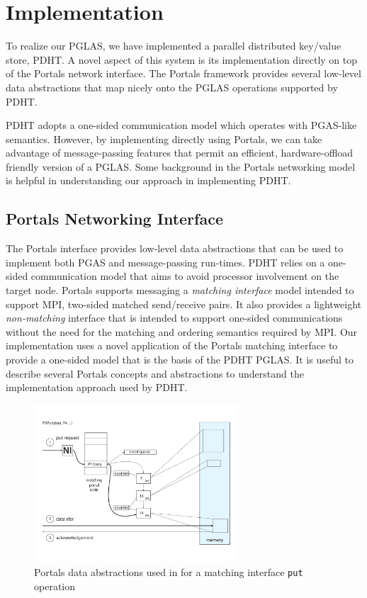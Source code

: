 \section{Implementation}

To realize our PGLAS, we have implemented a parallel distributed key/value store, 
PDHT. A novel aspect of this system is its implementation directly on top of the
Portals network interface. The Portals framework provides several low-level 
data abstractions that map nicely onto the PGLAS operations supported by PDHT.

PDHT adopts a one-sided communication model which operates 
with PGAS-like semantics. However, by implementing directly using Portals, we
can take advantage of message-passing features that permit an efficient, 
hardware-offload friendly version of a PGLAS. Some background in the Portals
networking model is helpful in understanding our approach in implementing PDHT.

\subsection{Portals Networking Interface}


The Portals interface provides low-level data abstractions that can be used to
implement both PGAS and message-passing run-times. PDHT relies on a one-sided
communication model that aims to avoid processor involvement on the target
node. Portals supports messaging a {\em matching interface} model intended to
support MPI, two-sided matched send/receive pairs. It also provides a
lightweight {\em non-matching} interface that is intended to support one-sided
communications without the need for the matching and ordering semantics
required by MPI. Our implementation uses a novel application of the Portals
matching interface to provide a one-sided model that is the basis of the PDHT
PGLAS. It is useful to describe several Portals concepts and abstractions to
understand the implementation approach used by PDHT.

\begin{figure}[ht]
  \centering
  \includegraphics[width=3in]{figs/portals_put}
  \caption{Portals data abstractions used in for a matching interface {\tt put} operation}
  \label{fig:portals_put}
\end{figure}

